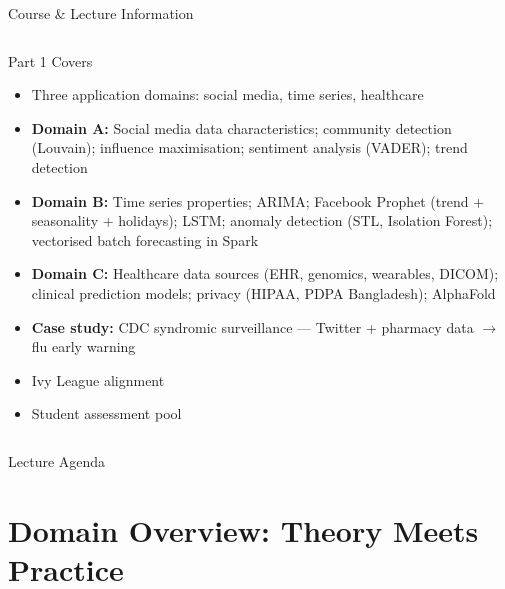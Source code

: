 \documentclass[aspectratio=169,10pt]{beamer}
\begin{document}
\begin{frame}{Course \& Lecture Information}
\begin{columns}[T]
      \begin{exampleblock}{Part 1 Covers}
        \begin{itemize}
          \item Three application domains: social media, time series, healthcare
          \item \textbf{Domain A:} Social media data characteristics; community detection (Louvain); influence maximisation; sentiment analysis (VADER); trend detection
          \item \textbf{Domain B:} Time series properties; ARIMA; Facebook Prophet (trend + seasonality + holidays); LSTM; anomaly detection (STL, Isolation Forest); vectorised batch forecasting in Spark
          \item \textbf{Domain C:} Healthcare data sources (EHR, genomics, wearables, DICOM); clinical prediction models; privacy (HIPAA, PDPA Bangladesh); AlphaFold
          \item \textbf{Case study:} CDC syndromic surveillance --- Twitter + pharmacy data $\to$ flu early warning
          \item Ivy League alignment
          \item Student assessment pool
        \end{itemize}
      \end{exampleblock}
  \end{columns}
\end{frame}

\begin{frame}{Lecture Agenda}\tableofcontents\end{frame}

\section{Domain Overview: Theory Meets Practice}
\end{document}
